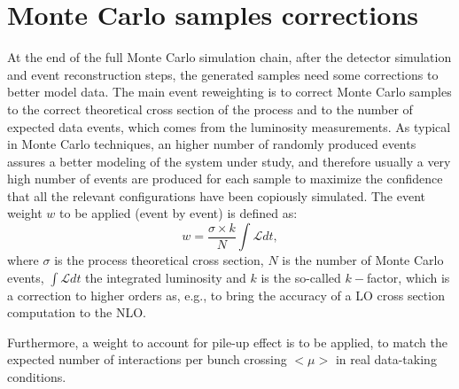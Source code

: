 \section{Monte Carlo samples corrections}\label{sec:mcweights}

At the end of the full Monte Carlo simulation chain, after the detector simulation
and event reconstruction steps, the generated samples need some corrections to
better model data. The main event reweighting is to correct Monte Carlo samples to
the correct theoretical cross section of the process and to the number of expected
data events, which comes from the luminosity measurements. As typical in Monte
Carlo techniques, an higher number of randomly produced events assures a better modeling
of the system under study, and therefore usually a very high number of events are
produced for each sample to maximize the confidence that all the relevant configurations
have been copiously simulated. The event weight $w$ to be applied (event by event) is defined
as:
\begin{equation}\label{eq:mcweight}
w = \dfrac{\sigma\times k}{N}\int \mathcal L dt,
\end{equation}
where $\sigma$ is the process theoretical cross section, $N$ is the number of Monte
Carlo events, $\int \mathcal L dt$ the integrated luminosity and $k$ is the so-called
$k-$factor, which is a correction to higher orders as, e.g., to bring the accuracy
of a LO cross section computation to the NLO.

Furthermore, a weight to account for pile-up effect is to be applied, to match the
expected number of interactions per bunch crossing $<\mu>$ in real data-taking conditions. 
